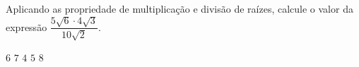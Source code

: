 Aplicando as propriedade de multiplicação e divisão de raízes, calcule o valor da expressão $\dfrac{5\sqrt{6}\cdot 4\sqrt{3}}{10\sqrt{2}}$.

$6$
$7$
$4$
$5$
$8$


